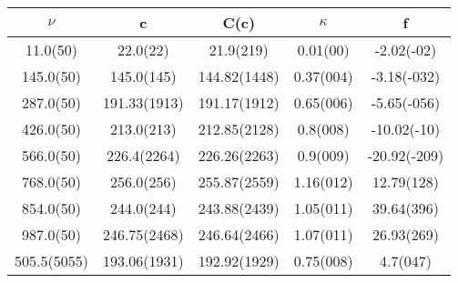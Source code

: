 \begin{table}[H]
	\centering
	\begin{tabular}{ccccc}
		$\nu$ & c & C(c) & $\kappa$ & f\\
		\hline
		11.0(50) & 22.0(22) & 21.9(219) & 0.01(00) & -2.02(-02)	\\
		145.0(50) & 145.0(145) & 144.82(1448) & 0.37(004) & -3.18(-032)	\\
		287.0(50) & 191.33(1913) & 191.17(1912) & 0.65(006) & -5.65(-056)	\\
		426.0(50) & 213.0(213) & 212.85(2128) & 0.8(008) & -10.02(-10)	\\
		566.0(50) & 226.4(2264) & 226.26(2263) & 0.9(009) & -20.92(-209)	\\
		768.0(50) & 256.0(256) & 255.87(2559) & 1.16(012) & 12.79(128)	\\
		854.0(50) & 244.0(244) & 243.88(2439) & 1.05(011) & 39.64(396)	\\
		987.0(50) & 246.75(2468) & 246.64(2466) & 1.07(011) & 26.93(269)	\\
		505.5(5055) & 193.06(1931) & 192.92(1929) & 0.75(008) & 4.7(047)	\\
	\end{tabular}
\end{table}